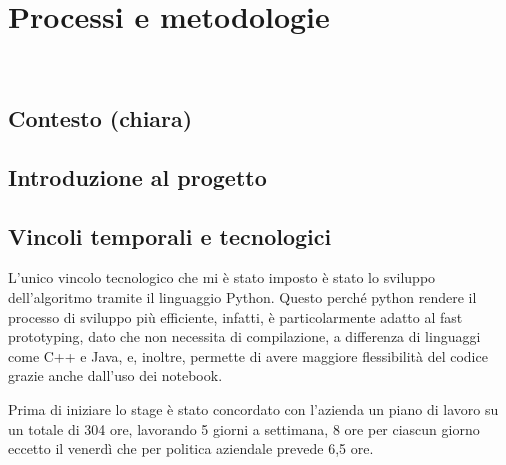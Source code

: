 \chapter{Processi e metodologie}
\label{cap:processi-metodologie}

\\

\section{Contesto (chiara)}

\section{Introduzione al progetto}

\section{Vincoli temporali e tecnologici}
L'unico vincolo tecnologico che mi è stato imposto è stato lo sviluppo dell'algoritmo tramite il linguaggio Python. Questo perché python rendere il processo di sviluppo più efficiente, infatti, è particolarmente adatto al fast prototyping, dato che non necessita di compilazione, a differenza di linguaggi come C++ e Java, e, inoltre, permette di avere maggiore flessibilità del codice grazie anche dall'uso dei notebook.

Prima di iniziare lo stage è stato concordato con l’azienda un piano di lavoro su un totale di 304 ore, lavorando 5 giorni a settimana, 8 ore per ciascun giorno eccetto il venerdì che per politica aziendale prevede 6,5 ore. 

